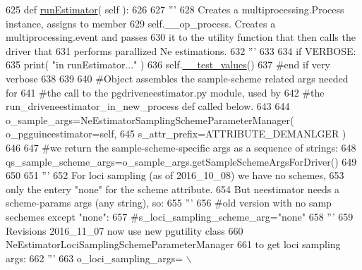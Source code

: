 \begin{DoxyCode}
625     \textcolor{keyword}{def }\hyperlink{classnegui_1_1temp_1_1PGGuiNeEstimator_aeca10842846f571142c767a394734f48}{runEstimator}( self ):
626 
627         \textcolor{stringliteral}{'''}
628 \textcolor{stringliteral}{        Creates a multiprocessing.Process instance, assigns to member}
629 \textcolor{stringliteral}{        self.\_\_op\_process.  Creates a multiprocessing.event and passes}
630 \textcolor{stringliteral}{        it to the utility function that then calls the driver that}
631 \textcolor{stringliteral}{        performs parallized Ne estimations.}
632 \textcolor{stringliteral}{        '''}
633 
634         \textcolor{keywordflow}{if} VERBOSE:
635             print( \textcolor{stringliteral}{"in runEstimator..."} )
636             self.\hyperlink{classnegui_1_1temp_1_1PGGuiNeEstimator_a5f9f62ff09ba209b6a0bcfb26267b321}{\_\_test\_values}()
637         \textcolor{comment}{#end if very verbose}
638 
639             
640         \textcolor{comment}{#Object assembles the sample-scheme related args needed for }
641         \textcolor{comment}{#the call to the pgdriveneestimator.py module, used by}
642         \textcolor{comment}{#the run\_driveneestimator\_in\_new\_process def called below.}
643 
644         o\_sample\_args=NeEstimatorSamplingSchemeParameterManager( o\_pgguineestimator=self, 
645                                                                     s\_attr\_prefix=ATTRIBUTE\_DEMANLGER )
646         
647         \textcolor{comment}{#we return the sample-scheme-specific args as a sequence of strings:}
648         qs\_sample\_scheme\_args=o\_sample\_args.getSampleSchemeArgsForDriver()
649 
650 
651         \textcolor{stringliteral}{'''}
652 \textcolor{stringliteral}{        For loci sampling (as of 2016\_10\_08) we have no schemes,}
653 \textcolor{stringliteral}{        only the entery "none" for the scheme attribute.}
654 \textcolor{stringliteral}{        But neestimator needs a scheme-params args (any string), so:}
655 \textcolor{stringliteral}{        '''}
656         \textcolor{comment}{#old version with no samp sechemes except "none":}
657         \textcolor{comment}{#s\_loci\_sampling\_scheme\_arg="none"}
658         \textcolor{stringliteral}{'''}
659 \textcolor{stringliteral}{        Revisions 2016\_11\_07 now use new pgutility class }
660 \textcolor{stringliteral}{        NeEstimatorLociSamplingSchemeParameterManager}
661 \textcolor{stringliteral}{        to get loci sampling args:}
662 \textcolor{stringliteral}{        '''}
663         o\_loci\_sampling\_args= \(\backslash\)

\end{DoxyCode}
